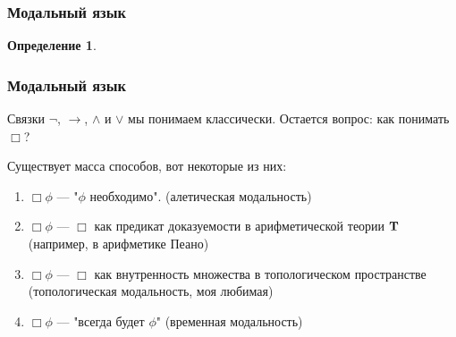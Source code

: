 \documentclass[pdf,utf8,russian,aspectratio=169]{beamer}
\newtheorem{defin}{Определение}
\begin{document}
\begin{frame}
  \frametitle{Модальный язык}

  \begin{defin}

    \begin{enumerate}
    \end{enumerate}

  \end{defin}
\end{frame}

\begin{frame}
  \frametitle{Модальный язык}
  Связки $\neg$, $\to$, $\land$ и $\lor$ мы понимаем классически. Остается вопрос: как понимать $\Box$?

  Существует масса способов, вот некоторые из них:

  \begin{enumerate}
    \item $\Box \phi$ --- "$\phi$ необходимо". (алетическая модальность)
    \item $\Box \phi$ --- $\Box$ как предикат доказуемости в арифметической теории $\bf T$ (например, в арифметике Пеано)
    \item $\Box \phi$ --- $\Box$ как внутренность множества в топологическом пространстве (топологическая модальность, моя любимая)
    \item $\Box \phi$ --- "всегда будет $\phi$" (временная модальность)
  \end{enumerate}
\end{frame}
\end{document}
